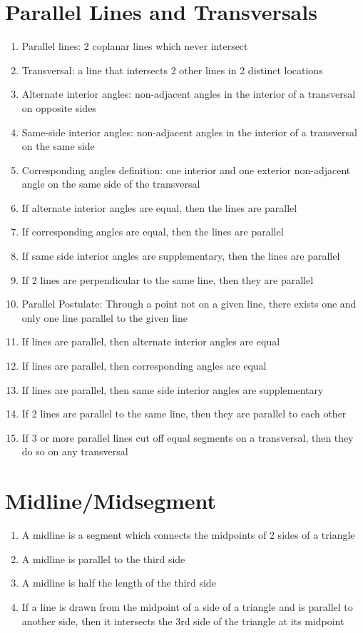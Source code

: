 \section*{Parallel Lines and Transversals}
\begin{enumerate}
    \item Parallel lines: 2 coplanar lines which never intersect
    \item Transversal: a line that intersects 2 other lines in 2 distinct locations
    \item Alternate interior angles: non-adjacent angles in the interior of a transversal on opposite sides
    \item Same-side interior angles: non-adjacent angles in the interior of a transversal on the same side
    \item Corresponding angles definition: one interior and one exterior non-adjacent angle on the same side of the transversal
    \item If alternate interior angles are equal, then the lines are parallel
    \item If corresponding angles are equal, then the lines are parallel
    \item If same side interior angles are supplementary, then the lines are parallel
    \item If 2 lines are perpendicular to the same line, then they are parallel
    \item Parallel Postulate: Through a point not on a given line, there exists one and only one line parallel to the given line
    \item If lines are parallel, then alternate interior angles are equal
    \item If lines are parallel, then corresponding angles are equal
    \item If lines are parallel, then same side interior angles are supplementary
    \item If 2 lines are parallel to the same line, then they are parallel to each other
    \item If 3 or more parallel lines cut off equal segments on a transversal, then they do so on any transversal
\end{enumerate}

\section*{Midline/Midsegment}
\begin{enumerate}
    \item A midline is a segment which connects the midpoints of 2 sides of a triangle
    \item A midline is parallel to the third side
    \item A midline is half the length of the third side
    \item If a line is drawn from the midpoint of a side of a triangle and is parallel to another side, then it intersects the 3rd side of the triangle at its midpoint
\end{enumerate}

